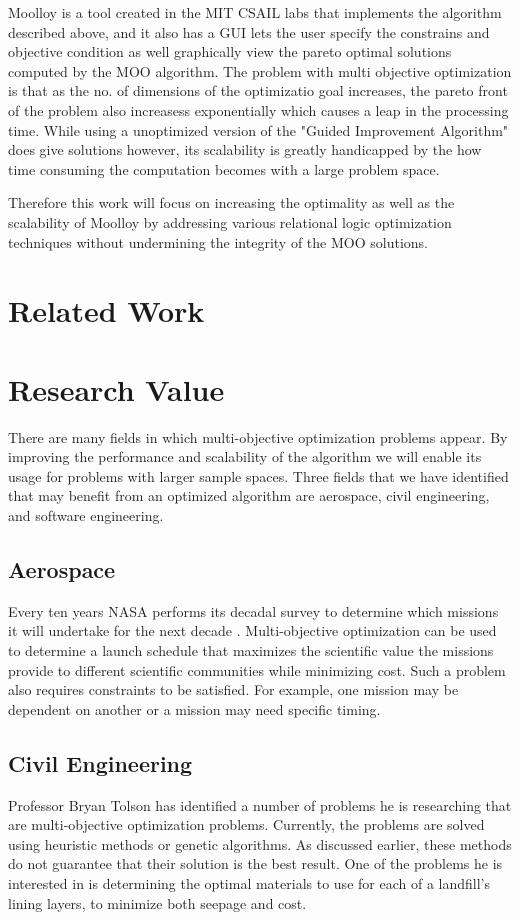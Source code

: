 \documentclass[11pt]{article}
\begin{document}
Moolloy is a tool created in the MIT CSAIL labs that implements the algorithm described above, and it also has a GUI lets the user specify the constrains and objective condition as well graphically view the pareto optimal solutions computed by the MOO algorithm. The problem with multi objective optimization is that as the no. of dimensions of the optimizatio goal increases, the pareto front of the problem also increasess  exponentially which causes a leap in the processing time. While using a unoptimized version of the "Guided Improvement Algorithm" does give solutions however, its scalability is greatly handicapped by the how time consuming the computation becomes with a large problem space.

Therefore this work will focus on increasing the optimality as well as the scalability of Moolloy by addressing various relational logic optimization techniques without undermining the integrity of the MOO solutions.

\section{Related Work}

\section{Research Value}
There are many fields in which multi-objective optimization problems
appear. By improving the performance and scalability of the algorithm
we will enable its usage for problems with larger sample spaces. Three
fields that we have identified that may benefit from an optimized
algorithm are aerospace, civil engineering, and software engineering.

\subsection{Aerospace}
Every ten years NASA performs its decadal survey to determine which
missions it will undertake for the next decade \cite{ref:decadal}.
Multi-objective optimization can be used to determine a launch schedule
that maximizes the scientific value the missions provide to different
scientific communities while minimizing cost. Such a problem also
requires constraints to be satisfied. For example, one mission may be
dependent on another or a mission may need specific timing.

\subsection{Civil Engineering}
Professor Bryan Tolson has identified a number of problems he is
researching that are multi-objective optimization problems. Currently,
the problems are solved using heuristic methods or genetic algorithms.
As discussed earlier, these methods do not guarantee that their
solution is the best result. One of the problems he is interested in is
determining the optimal materials to use for each of a landfill's
lining layers, to minimize both seepage and cost.
\end{document}
